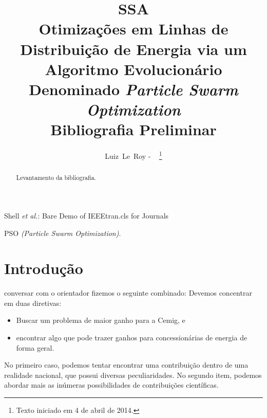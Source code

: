 \documentclass{IEEEtran}
\begin{document}
\title{SSA\\Otimizações em Linhas de Distribuição de Energia via um Algoritmo Evolucionário Denominado \textit{Particle Swarm Optimization}\\\textbf{Bibliografia Preliminar}}
%
%
%

\author{Luiz~Le~Roy - ~
\thanks{Texto iniciado em 4 de abril de 2014.}}

%
{Shell \MakeLowercase{\textit{et al.}}: Bare Demo of IEEEtran.cls for Journals}

\maketitle

\begin{abstract}
Levantamento da bibliografia.
\end{abstract}

\begin{IEEEkeywords}
PSO \textit{(Particle Swarm Optimization)}.
\end{IEEEkeywords}

\IEEEpeerreviewmaketitle

\section{Introdução}
 conversar com o orientador fizemos o seguinte combinado:
Devemos concentrar em duas diretivas:
\begin{itemize}[]
\item Buscar um problema de maior ganho para a Cemig, e
\item encontrar algo que pode trazer ganhos para concessionárias de energia de forma geral.
\end{itemize}

No primeiro caso, podemos tentar encontrar uma contribuição dentro de uma realidade nacional, que possui diversas peculiaridades. No segundo item, podemos abordar mais as inúmeras possibilidades de contribuições científicas.
\end{document}
